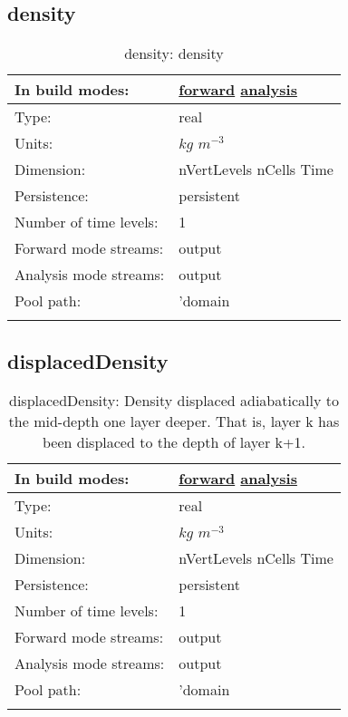 \subsection[density]{density}
\label{subsec:var_sec_diagnostics_density}
\begin{center}
\begin{longtable}{| p{2.0in} | p{4.0in} |}
        \hline 
        In build modes: & \hyperref[subsec:forward_var_tab_diagnostics]{forward} \hyperref[subsec:analysis_var_tab_diagnostics]{analysis} \\
        \hline 
        Type: & real \\
        \hline 
        Units: & $kg$ $m^{-3}$ \\
        \hline 
        Dimension: & nVertLevels nCells Time \\
        \hline 
        Persistence: & persistent \\
        \hline 
        Number of time levels: & 1 \\
        \hline 
		 Forward mode streams: &  output \\
        \hline 
		 Analysis mode streams: &  output \\
        \hline 
            Pool path: & 'domain %
 \\
		 \hline 
    \caption{density: density}
\end{longtable}
\end{center}
\subsection[displacedDensity]{displacedDensity}
\label{subsec:var_sec_diagnostics_displacedDensity}
\begin{center}
\begin{longtable}{| p{2.0in} | p{4.0in} |}
        \hline 
        In build modes: & \hyperref[subsec:forward_var_tab_diagnostics]{forward} \hyperref[subsec:analysis_var_tab_diagnostics]{analysis} \\
        \hline 
        Type: & real \\
        \hline 
        Units: & $kg$ $m^{-3}$ \\
        \hline 
        Dimension: & nVertLevels nCells Time \\
        \hline 
        Persistence: & persistent \\
        \hline 
        Number of time levels: & 1 \\
        \hline 
		 Forward mode streams: &  output \\
        \hline 
		 Analysis mode streams: &  output \\
        \hline 
            Pool path: & 'domain %
 \\
		 \hline 
    \caption{displacedDensity: Density displaced adiabatically to the mid-depth one layer deeper.  That is, layer k has been displaced to the depth of layer k+1.}
\end{longtable}
\end{center}
